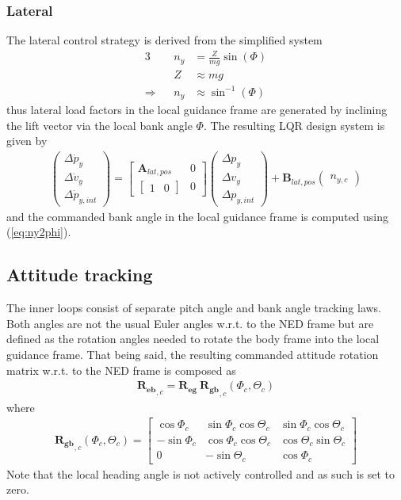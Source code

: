 \documentclass{ifacconf}
\newcommand{\mbf}[1]{\mathbf{#1}}
\providecommand{\mbf}[1]{\mathbf{#1}}
\newcommand{\Reb}{{\ensuremath{\mbf{R_{e  b}}}}}
\newcommand{\Reg}{{\ensuremath{\mbf{R_{e  g}}}}}
\newcommand{\Rgb}{{\ensuremath{\mbf{R_{g  b}}}}}
\begin{document}
\subsubsection{Lateral}
The lateral control strategy is derived from the simplified system
\begin{alignat}{3}
{} &&n_y &= \frac{Z}{m g} \sin(\Phi) \\
{} &&Z   &\approx m g \\
\Rightarrow &&n_y &\approx \sin^{-1}(\Phi) \label{eq:ny2phi}
\end{alignat}
%
thus lateral load factors in the local guidance frame are generated by inclining the lift vector via the local bank angle $\Phi$. The resulting LQR design system is given by
%
\begin{align}
\begin{pmatrix}
\Delta \dot{p}_y \\
\Delta \dot{v}_y \\
\Delta \dot{p}_{y,int} 
\end{pmatrix}
=
\begin{bmatrix}
\mbf{
A
}_{lat, pos} 
& 
0
\\
\begin{bmatrix}
1 & 0
\end{bmatrix}
& 
0
\end{bmatrix}
\begin{pmatrix}
\Delta {p}_y \\
\Delta {v}_y \\
\Delta {p}_{y,int} 
\end{pmatrix}
+
\mbf{
B
}_{lat, pos}
\begin{pmatrix}
n_{y,c}
\end{pmatrix}
\end{align}
and the commanded bank angle in the local guidance frame is computed using  (\ref{eq:ny2phi}).
\subsection{Attitude tracking}
The inner loops consist of separate pitch angle and bank angle tracking laws. Both angles are not the usual Euler angles w.r.t. to the NED frame but are defined as the rotation angles needed to rotate the body frame into the local guidance frame. That being said, the resulting commanded attitude rotation matrix w.r.t. to the NED frame is composed as
\begin{align}
\Reb_{,c} 
= 
\Reg \: \Rgb_{,c} (\Phi_c, \Theta_c)
\end{align}
where
\begin{align}
\Rgb_{,c} (\Phi_c, \Theta_c)
= 
\begin{bmatrix}
\cos \Phi_c &  \sin \Phi_c \cos \Theta_c & \sin \Phi_c \cos \Theta_c \\
-\sin \Phi_c& \cos \Phi_c \cos \Theta_c  & \cos \Theta_c \sin  \Theta_c \\
0 & -\sin \Theta_c & \cos \Phi_c
\end{bmatrix}
\end{align}
Note that the local heading angle is not actively controlled and as such is set to zero.
%
\end{document}
